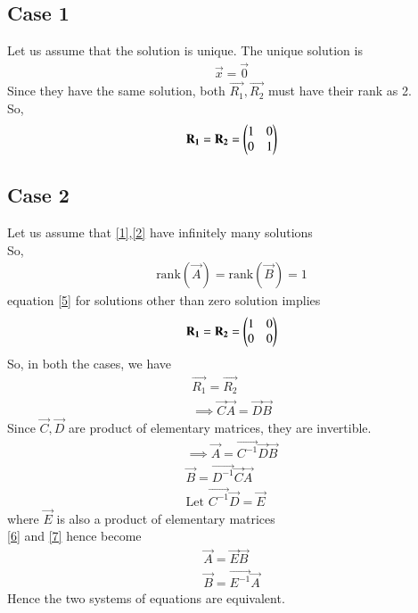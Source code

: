 \documentclass[journal,12pt,twocolumn]{IEEEtran}
\begin{document}
\subsection{Case 1}
Let us assume that the solution is unique.
The unique solution is
\begin{align}
    \vec{x}=\vec{0}
\end{align}
Since they have the same solution, both $\vec{R_1},\vec{R_2}$ must have their rank as 2.\\
So,
\begin{align}
    \mathbf{R_1}=\mathbf{R_2}=\begin{pmatrix}1&0\\0&1\end{pmatrix}
\end{align}

\subsection{Case 2}
Let us assume that \eqref{1},\eqref{2} have infinitely many solutions\\
So,
\begin{align}
\text{rank}(\vec{A})= \text{rank}(\vec{B}) = 1
\end{align}
equation \eqref{5} for solutions other than zero solution implies
\begin{align}
    \mathbf{R_1}=\mathbf{R_2}=\begin{pmatrix}1&0\\0&0\end{pmatrix}
\end{align}
So, in both the cases, we have 
\begin{align}
     \vec{R_1}=\vec{R_2}\\
     \implies \vec{C}\vec{A}=\vec{D}\vec{B}
\end{align}
Since $\vec{C},\vec{D}$ are product of elementary matrices, they are invertible.
\begin{align}
    \implies \vec{A}= \vec{C^{-1}}\vec{D}\vec{B}\label{6}\\
    \vec{B}=\vec{D^{-1}}\vec{C}\vec{A}\label{7}\\
    \text{Let } \vec{C^{-1}}\vec{D}=\vec{E}
\end{align}
where $\vec{E}$ is also a product of elementary matrices\\
\eqref{6} and \eqref{7} hence become
\begin{align}
\vec{A}=\vec{E}\vec{B}\\
\vec{B}=\vec{E^{-1}}\vec{A}
\end{align}
Hence the two systems of equations are equivalent.
\end{document}
